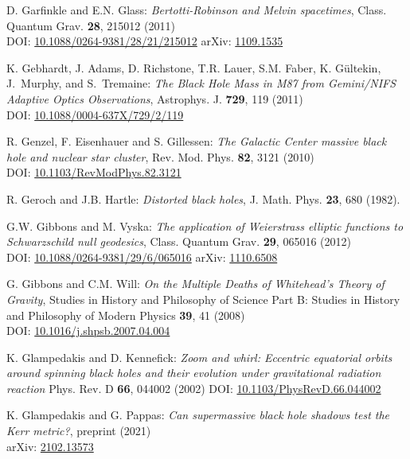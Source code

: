 \begin{thebibliography}{123}
D. Garfinkle and E.N. Glass:
{\em Bertotti-Robinson and Melvin spacetimes},
Class. Quantum Grav. {\bf 28}, 215012 (2011)\\
DOI: \href{https://doi.org/10.1088/0264-9381/28/21/215012}{10.1088/0264-9381/28/21/215012}\hfill
arXiv: \href{https://arxiv.org/abs/1109.1535}{1109.1535}

K. Gebhardt, J. Adams, D. Richstone, T.R. Lauer, S.M. Faber, K. Gültekin, J.~Murphy, and S.~Tremaine:
{\em The Black Hole Mass in M87 from Gemini/NIFS Adaptive Optics Observations},
Astrophys. J. {\bf 729}, 119 (2011)\\
DOI: \href{https://doi.org/10.1088/0004-637X/729/2/119}{10.1088/0004-637X/729/2/119}

R. Genzel, F. Eisenhauer and S. Gillessen:
{\em The Galactic Center massive black hole and nuclear star cluster},
Rev. Mod. Phys. {\bf 82}, 3121 (2010)\\
DOI: \href{https://doi.org/10.1103/RevModPhys.82.3121}{10.1103/RevModPhys.82.3121}

R. Geroch and J.B. Hartle: {\em Distorted black holes},
J. Math. Phys. {\bf 23}, 680 (1982).

G.W. Gibbons and M. Vyska:
{\em The application of Weierstrass elliptic functions to Schwarzschild null geodesics},
Class. Quantum Grav. {\bf 29}, 065016 (2012)\\
DOI: \href{https://doi.org/10.1088/0264-9381/29/6/065016}{10.1088/0264-9381/29/6/065016}\hfill
arXiv: \href{https://arxiv.org/abs/1110.6508}{1110.6508}

G. Gibbons and C.M. Will: {\em On the Multiple Deaths of Whitehead's Theory of Gravity},
Studies in History and Philosophy of Science Part B: Studies in History and Philosophy of Modern Physics {\bf 39}, 41 (2008)\\
DOI: \href{https://doi.org/10.1016/j.shpsb.2007.04.004}{10.1016/j.shpsb.2007.04.004}

K. Glampedakis and D. Kennefick:
{\em Zoom and whirl: Eccentric equatorial orbits around spinning black holes and their evolution under gravitational radiation reaction}
Phys. Rev. D {\bf 66}, 044002 (2002)
DOI: \href{https://doi.org/10.1103/PhysRevD.66.044002}{10.1103/PhysRevD.66.044002}

K. Glampedakis and G. Pappas:
{\em Can supermassive black hole shadows test the Kerr metric?},
preprint (2021)\\
arXiv: \href{https://arxiv.org/abs/2102.13573}{2102.13573}


\end{thebibliography}
